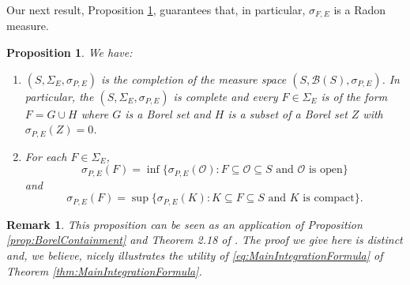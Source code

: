\documentclass[11pt]{article}
\newtheorem{proposition}[theorem]{Proposition}
\newtheorem{remark}{Remark}
\begin{document}
\noindent Our next result, Proposition \ref{prop:Regular}, guarantees that, in particular, $\sigma_{F,E}$ is a Radon measure. 

\begin{proposition}\label{prop:Regular}
We have:
\begin{enumerate}
    \item\label{item:Complete} $(S,\Sigma_E,\sigma_{P,E})$ is the completion of the measure space $(S,\mathcal{B}(S),\sigma_{P,E})$. In particular, the $(S,\Sigma_E,\sigma_{P,E})$ is complete and every $F\in \Sigma_E$ is of the form $F=G\cup H$ where $G$ is a Borel set and $H$ is a subset of a Borel set $Z$ with $\sigma_{P,E}(Z)=0$.
\item\label{item:Regular} For each $F\in\Sigma_E$,
\begin{equation}\label{eq:OuterRegular}
\sigma_{P,E}(F)=\inf\{\sigma_{P,E}(\mathcal{O}):F\subseteq\mathcal{O}\subseteq S\mbox{ and $\mathcal{O}$ is open}\}
\end{equation}
and
\begin{equation}
\sigma_{P,E}(F)=\sup\{\sigma_{P,E}(K):K\subseteq F\subseteq S\mbox{ and $K$ is compact}\}.
\end{equation}
\end{enumerate} 
\end{proposition}
\begin{remark}
This proposition can be seen as an application of Proposition \ref{prop:BorelContainment} and Theorem 2.18 of \cite{Rudin1987}. The proof we give here is distinct and, we believe, nicely illustrates the utility of \eqref{eq:MainIntegrationFormula} of Theorem \ref{thm:MainIntegrationFormula}.
\end{remark}
\end{document}
